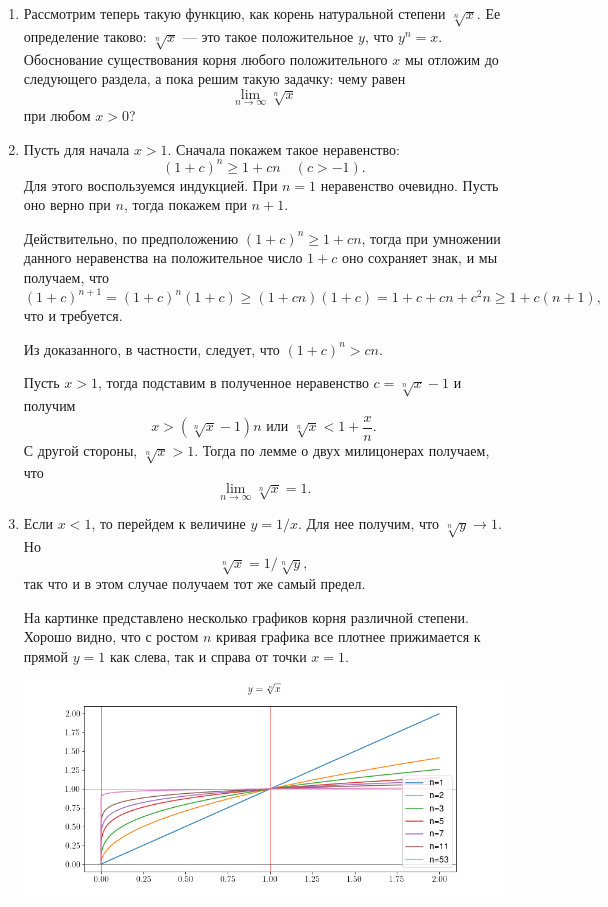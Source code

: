 \begin{enumerate}
\item Рассмотрим теперь такую функцию, как корень натуральной степени $\sqrt[n]{x}$. Ее определение таково: $\sqrt[n]{x}$ --- это такое положительное $y$, что $y^n=x$. Обоснование существования корня любого положительного $x$ мы отложим до следующего раздела, а пока решим такую задачку: чему равен 
$$
\lim_{n\to \infty}\sqrt[n]{x}
$$
при любом $x>0$?
\item Пусть для начала $x>1$. Сначала покажем такое неравенство:
$$
(1+c)^n\ge 1+cn\quad(c>-1).
$$
Для этого воспользуемся индукцией. При $n=1$ неравенство очевидно. Пусть оно верно при $n$, тогда покажем при $n+1$.

Действительно, по предположению $(1+c)^n\ge 1+cn$, тогда при умножении данного неравенства на положительное число $1+c$ оно сохраняет знак, и мы получаем, что
$$
(1+c)^{n+1}=(1+c)^n(1+c)\ge (1+cn)(1+c)=1+c+cn+c^2n\ge 1+c(n+1),
$$
что и требуется.

Из доказанного, в частности, следует, что $(1+c)^n>cn$. 

Пусть $x>1$, тогда подставим в полученное неравенство $c=\sqrt[n]{x}-1$ и получим
$$
x>(\sqrt[n]{x}-1)n\mbox{ или }\sqrt[n]{x}<1+\frac xn.
$$
С другой стороны, $\sqrt[n]{x}>1$. Тогда по лемме о двух милицонерах получаем, что
$$
\lim_{n\to \infty}\sqrt[n]{x}=1.
$$

\item Если $x<1$, то перейдем к величине $y=1/x$. Для нее получим, что $\sqrt[n]{y}\to 1$. Но
$$
\sqrt[n]{x}=1/\sqrt[n]{y},
$$
так что и в этом случае получаем тот же самый предел.

На картинке представлено несколько графиков корня различной степени. Хорошо видно, что с ростом $n$ кривая графика все плотнее прижимается к прямой $y=1$ как слева, так и справа от точки $x=1$.
\begin{center}
\includegraphics[scale=0.5]{root.png}
\end{center}



\end{enumerate}
